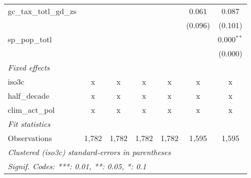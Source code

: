 \begin{tabular}{lcccccc}
   gc\_tax\_totl\_gd\_zs                               &         &         &         &               & 0.061          & 0.087\\   
                                                       &         &         &         &               & (0.096)        & (0.101)\\   
   sp\_pop\_totl                                       &         &         &         &               &                & 0.000$^{**}$\\   
                                                       &         &         &         &               &                & (0.000)\\   
   \emph{Fixed effects}\\
   iso3c                                               & x       & x       & x       & x             & x              & x\\  
   half\_decade                                        & x       & x       & x       & x             & x              & x\\  
   clim\_act\_pol                                      & x       & x       & x       & x             & x              & x\\  
   \midrule \emph{Fit statistics}\\
   Observations                                        & 1,782   & 1,782   & 1,782   & 1,782         & 1,595          & 1,595\\  
   \midrule
   \multicolumn{7}{l}{\emph{Clustered (iso3c) standard-errors in parentheses}}\\
   \multicolumn{7}{l}{\emph{Signif. Codes: ***: 0.01, **: 0.05, *: 0.1}}\\
\end{tabular}
\par\endgroup


